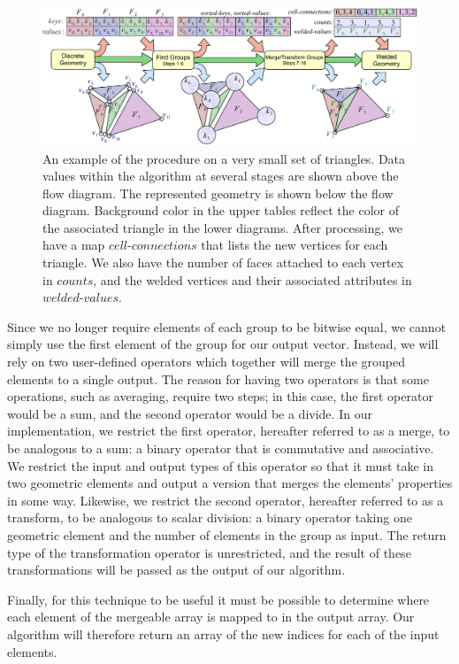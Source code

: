 \documentclass[10pt,journal,cspaper,compsoc]{IEEEtran}
\begin{document}
\begin{figure}[!tb]
\includegraphics[width=\textwidth]{KeyWeld.pdf}
\caption{An example of the  procedure on a very small set of triangles. Data values within the algorithm at several stages are shown above the flow diagram. The represented geometry is shown below the flow diagram. Background color in the upper tables reflect the color of the associated triangle in the lower diagrams. After processing, we have a map $cell\mbox{-}connections$ that lists the new vertices for each triangle. We also have the
number of faces attached to each vertex in $counts$, and the welded vertices and their associated attributes in $welded\mbox{-}values.$}
\label{fig:KeyWeld}
\end{figure}



Since we no longer require elements of each group to be bitwise
equal, we cannot simply use the first element of the group for our output vector. Instead, we will rely on two user-defined operators
which together will merge the grouped elements to a single output. The reason for having two operators is that some operations, such
as averaging, require two steps; in this case, the first operator would be a sum, and the second operator would be a divide. In our
implementation, we restrict the first operator, hereafter referred to as a merge, to be analogous to a sum: a binary operator that is commutative and associative. We restrict the input and output types of this operator so that it must take in two geometric elements and output a version that merges the elements' properties in some way.
Likewise, we restrict the second operator, hereafter referred to as a transform, to be analogous to scalar division: a binary operator taking one geometric element and the number of elements in the
group as input. The return type of the transformation operator is unrestricted, and the result of these transformations will be passed as the output of our algorithm. 

Finally, for this technique to be useful it must be possible to determine where each element of the mergeable array is mapped to in the output array. 
Our algorithm will therefore return an array of the new indices for each of the input elements.
\end{document}
